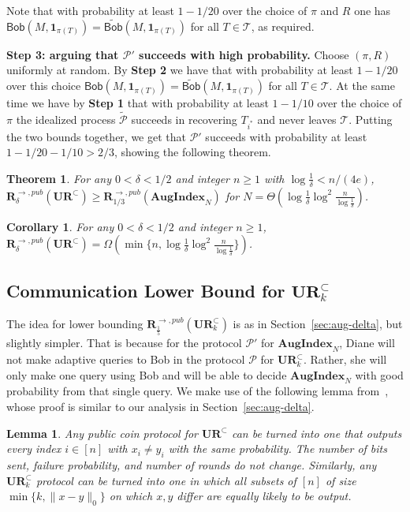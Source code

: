 \documentclass[11pt]{article}
\newtheorem{theorem}{Theorem}
\newtheorem{lemma}{Lemma}
\newtheorem{corollary}{Corollary}
\newcommand{\aug}{\mathbf{AugIndex}\xspace}
\newcommand{\query}{\mathsf{Bob}}
\newcommand{\ur}{\mathbf{UR}\xspace}
\newcommand{\randcom}{\mathbf{R}}
\begin{document}
Note that with probability at least $1-1/20$ over the choice of $\pi$ and $R$ one has $\query(M, \mathbf{1}_{\pi(T)})=\widetilde{\query}(M, \mathbf{1}_{\pi(T)})$ for all $T\in \mathcal{T}$, as required.


{\bf Step 3: arguing that $\mathcal{P}'$ succeeds with high probability.}  Choose $(\pi, R)$ uniformly at random. By {\bf Step 2} we have that with probability at least $1-1/20$ over this choice 
$\query(M, \mathbf{1}_{\pi(T)})=\widetilde{\query}(M, \mathbf{1}_{\pi(T)})$ for all $T\in \mathcal{T}$. At the same time we have by {\bf Step 1} that with probability at least $1-1/10$ over the choice of $\pi$ the idealized process $\widetilde{\mathcal{P}}$ 
succeeds in recovering $T_{i^*}$ and never leaves $\mathcal{T}$. Putting the two bounds together, we get that $\mathcal{P}'$ succeeds with probability at least $1-1/20-1/10>2/3$, showing the following theorem.


\begin{theorem}
For any $0<\delta<1/2$ and integer $n\ge 1$ with $\log \frac 1{\delta} < n/(4e)$, $\randcom^{\rightarrow,pub}_\delta(\ur^\subset) \ge \randcom^{\rightarrow,pub}_{1/3}(\aug_N)$ for $N = \Theta(\log\frac 1{\delta} \log^2 \frac n{\log \frac 1{\delta}})$.
\end{theorem}

\begin{corollary}
For any $0<\delta<1/2$ and integer $n\ge 1$, $\randcom^{\rightarrow,pub}_\delta(\ur^\subset) = \Omega(\min\{n, \log\frac 1{\delta} \log^2 \frac n{\log \frac 1{\delta}}\})$.
\end{corollary}

\subsection{Communication Lower Bound for $\ur_k^\subset$}\label{sec:aug-k}

The idea for lower bounding $\randcom^{\rightarrow,pub}_{\frac 15}(\ur_k^\subset)$ is as in Section~\ref{sec:aug-delta}, but slightly simpler. That is because for the protocol $\mathcal P'$ for $\aug_N$, Diane will not make adaptive queries to Bob in the protocol $\mathcal P$ for $\ur_k^\subset$. Rather, she will only make one query using Bob and will be able to decide $\aug_N$ with good probability from that single query. We  make use of the following lemma from~\cite{JowhariST11}, whose proof is similar to our analysis in Section~\ref{sec:aug-delta}.

\begin{lemma}{\cite{JowhariST11}}\label{lem:rand-ur}
Any public coin protocol for $\ur^\subset$ can be turned into one that outputs every index $i\in[n]$ with $x_i\neq y_i$ with the same probability. The number of bits sent, failure probability, and number of rounds do not change. Similarly, any $\ur_k^\subset$ protocol can be turned into one in which all subsets of $[n]$ of size $\min\{k, \|x-y\|_0\}$ on which $x, y$ differ are equally likely to be output.
\end{lemma}
\end{document}

